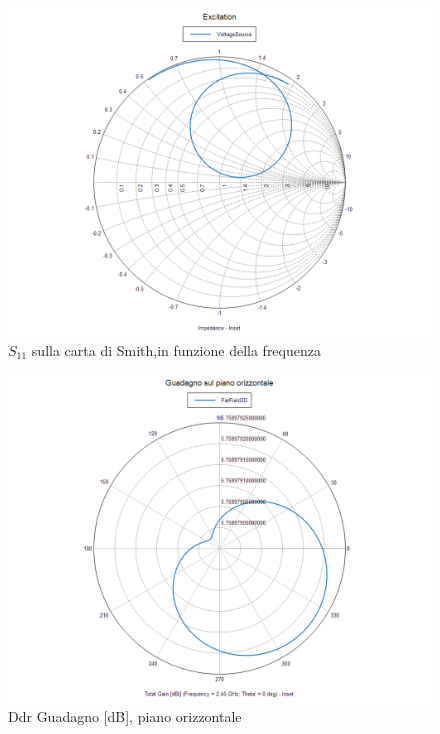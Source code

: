 \documentclass[twoside,twocolumn]{article}
\begin{document}
\begin{figure}[h!]
  \includegraphics[width=\linewidth]{A_Smith.png}
  \caption{$S_{11} $ sulla carta di Smith,in funzione della frequenza}
  \label{fig:A_Smith}
\end{figure}

\begin{figure}[h!]
  \includegraphics[width=\linewidth]{A_orizzontale.png}
  \caption{Ddr Guadagno [dB], piano orizzontale}
  \label{fig:A_orizzontale}
\end{figure}
\end{document}
